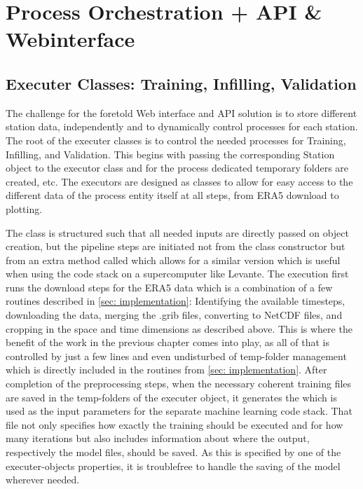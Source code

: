 \section{Process Orchestration + API \& Webinterface}
\label{sec: process_orchestration}

\subsection{Executer Classes: Training, Infilling, Validation}

The challenge for the foretold Web interface and API solution is to store different station data, independently and to dynamically control processes for each station.
The root of the executer classes is to control the needed processes for Training, Infilling, and Validation.
This begins with passing the corresponding Station object to the executor class and for the process dedicated temporary folders are created, etc.
The executors are designed as classes to allow for easy access to the different data of the process entity itself at all steps, from ERA5 download to plotting.

The  class is structured such that all needed inputs are directly passed on object creation, but the pipeline steps are initiated not from the class constructor but from an extra method called  which allows for a similar  version which is useful when using the code stack on a supercomputer like Levante.
The execution first runs the download steps for the ERA5 data which is a combination of a few routines described in \autoref{sec: implementation}: Identifying the available timesteps, downloading the data, merging the .grib files, converting to NetCDF files, and cropping in the space and time dimensions as described above.
This is where the benefit of the work in the previous chapter comes into play, as all of that is controlled by just a few lines and even undisturbed of temp-folder management which is directly included in the routines from \autoref{sec: implementation}.
After completion of the preprocessing steps, when the necessary coherent training files are saved in the temp-folders of the executer object, it generates the  which is used as the input parameters for the separate machine learning code stack.
That file not only specifies how exactly the training should be executed and for how many iterations but also includes information about where the output, respectively the model files, should be saved.
As this is specified by one of the executer-objects properties, it is troublefree to handle the saving of the model wherever needed.

